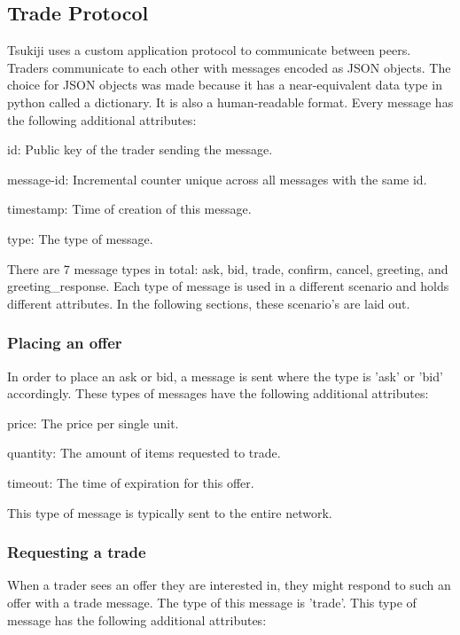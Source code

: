 \subsection{Trade Protocol}
\label{protocol}

Tsukiji uses a custom application protocol to communicate between peers.
Traders communicate to each other with messages encoded as JSON objects.
The choice for JSON objects was made because it has a near-equivalent data type in python called a dictionary.
It is also a human-readable format.
Every message has the following additional attributes:
\begin{myitemize}
\item id: Public key of the trader sending the message.
\item message-id: Incremental counter unique across all messages with the same id.
\item timestamp: Time of creation of this message.
\item type: The type of message.
\end{myitemize}

There are 7 message types in total: ask, bid, trade, confirm, cancel, greeting, and greeting\_response. Each type of message is used in a different scenario and holds different attributes. In the following sections, these scenario's are laid out.

\subsubsection{Placing an offer}
In order to place an ask or bid, a message is sent where the type is 'ask' or 'bid' accordingly.
These types of messages have the following additional attributes:
\begin{myitemize}
\item price: The price per single unit.
\item quantity: The amount of items requested to trade.
\item timeout: The time of expiration for this offer.
\end{myitemize}

This type of message is typically sent to the entire network.

\subsubsection{Requesting a trade}
When a trader sees an offer they are interested in, they might respond to such an offer with a trade message.
The type of this message is 'trade'.
This type of message has the following additional attributes:

